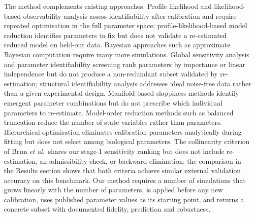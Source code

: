 \documentclass[pdflatex,sn-nature]{sn-jnl}
\theoremstyle{plain}
\begin{document}
The method complements existing approaches. Profile likelihood\cite{bib24,bib25} and likelihood-based observability analysis\cite{bib17} assess identifiability after calibration and require repeated optimisation in the full parameter space; profile-likelihood-based model reduction\cite{bib37} identifies parameters to fix but does not validate a re-estimated reduced model on held-out data. Bayesian approaches such as approximate Bayesian computation\cite{bib20} require many more simulations. Global sensitivity analysis\cite{bib26,bib23} and parameter identifiability screening\cite{bib38} rank parameters by importance or linear independence but do not produce a non-redundant subset validated by re-estimation; structural identifiability analysis\cite{bib4,bib10,bib29} addresses ideal noise-free data rather than a given experimental design. Manifold-based sloppiness methods\cite{bib36} identify emergent parameter combinations but do not prescribe which individual parameters to re-estimate. Model-order reduction methods such as balanced truncation\cite{bib22,bib1} reduce the number of state variables rather than parameters. Hierarchical optimisation\cite{bib39} eliminates calibration parameters analytically during fitting but does not select among biological parameters. The collinearity criterion of Brun \emph{et al.}\,\cite{bib9} shares our stage-1 sensitivity ranking but does not include re-estimation, an admissibility check, or backward elimination; the comparison in the Results section shows that both criteria achieve similar external validation accuracy on this benchmark. Our method requires a number of simulations that grows linearly with the number of parameters, is applied before any new calibration, uses published parameter values as its starting point, and returns a concrete subset with documented fidelity, prediction and robustness.
\end{document}
